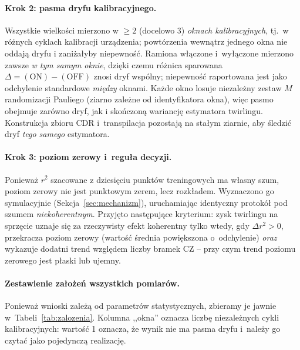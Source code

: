 \documentclass[11pt]{article}
\begin{document}
\paragraph{Krok 2: pasma dryfu kalibracyjnego.} Wszystkie wielkości mierzono w $\ge 2$ (docelowo 3)
\emph{oknach kalibracyjnych}, tj.\ w różnych cyklach kalibracji urządzenia; powtórzenia wewnątrz
jednego okna nie oddają dryfu i zaniżałyby niepewność. Ramiona włączone i~wyłączone mierzono
zawsze \emph{w tym samym oknie}, dzięki czemu różnica sparowana $\Delta = (\text{ON}) - (\text{OFF})$
znosi dryf wspólny; niepewność raportowana jest jako odchylenie standardowe \emph{między} oknami. Każde
okno losuje niezależny zestaw $M$ randomizacji Pauliego (ziarno zależne od identyfikatora okna), więc
pasmo obejmuje zarówno dryf, jak i skończoną wariancję estymatora twirlingu. Konstrukcja zbioru CDR
i~transpilacja pozostają na stałym ziarnie, aby śledzić dryf \emph{tego samego} estymatora.

\paragraph{Krok 3: poziom zerowy i~reguła decyzji.} Ponieważ $r^2$ szacowane z dziesięciu punktów
treningowych ma własny szum, poziom zerowy nie jest punktowym zerem, lecz rozkładem. Wyznaczono go
symulacyjnie (Sekcja~\ref{sec:mechanizm}), uruchamiając identyczny protokół pod szumem
\emph{niekoherentnym}. Przyjęto następujące kryterium: zysk twirlingu na sprzęcie uznaje się za
rzeczywisty efekt koherentny tylko wtedy, gdy $\Delta r^2 > 0$, przekracza poziom zerowy (wartość
średnia powiększona o~odchylenie) \emph{oraz} wykazuje dodatni trend względem liczby bramek CZ --
przy czym trend poziomu zerowego jest płaski lub ujemny.

\paragraph{Zestawienie założeń wszystkich pomiarów.} Ponieważ wnioski zależą od parametrów
statystycznych, zbieramy je jawnie w~Tabeli~\ref{tab:zalozenia}. Kolumna ,,okna'' oznacza liczbę
niezależnych cykli kalibracyjnych: wartość 1 oznacza, że wynik nie ma pasma dryfu i~należy go czytać
jako pojedynczą realizację.
\end{document}

